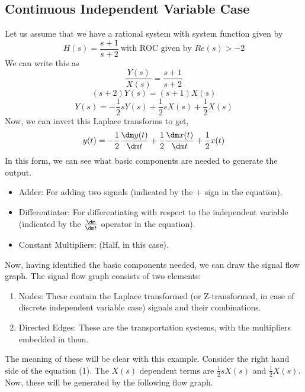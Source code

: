 \subsection{Continuous Independent Variable Case}
Let us assume that we have a rational system with system function given by
\[
H(s) = \frac{s+1}{s+2} \ \text{with ROC given by } Re(s)>-2
\]
We can write this as
\[ \frac{Y(s)}{X(s)} = \frac{s+1}{s+2} \]
\[ (s+2)Y(s) = (s+1)X(s) \]
\begin{equation}
Y(s) = -\frac{1}{2}s Y(s) + \frac{1}{2} s X(s) + \frac{1}{2}X(s)
\end{equation}
Now, we can invert this Laplace transforms to get,
\[ y(t) = -\frac{1}{2}\frac{\dm y(t)}{\dm t} + \frac{1}{2}\frac{\dm x(t)}{\dm t} + \frac{1}{2}x(t) \]
In this form, we can see what basic components are needed to generate the output.
\begin{itemize}
\item Adder: For adding two signals (indicated by the $+$ sign in the equation).
\item Differentiator: For differentiating with respect to the independent variable (indicated by the $\frac{\dm}{\dm t}$ operator in the equation).
\item Constant Multipliers: (Half, in this case).
\end{itemize}
Now, having identified the basic components needed, we can draw the signal flow graph. The signal flow graph consists of two elements:
\begin{enumerate}
\item Nodes: These contain the Laplace transformed (or Z-transformed, in case of discrete independent variable case) signals and their combinations.
\item Directed Edges: These are the transportation systems, with the multipliers embedded in them.
\end{enumerate}
The meaning of these will be clear with this example. Consider the right hand side of the equation (1). The $X(s)$ dependent terms are  $\frac{1}{2} s X(s)$ and $\frac{1}{2}X(s)$. Now, these will be generated by the following flow graph.\\
